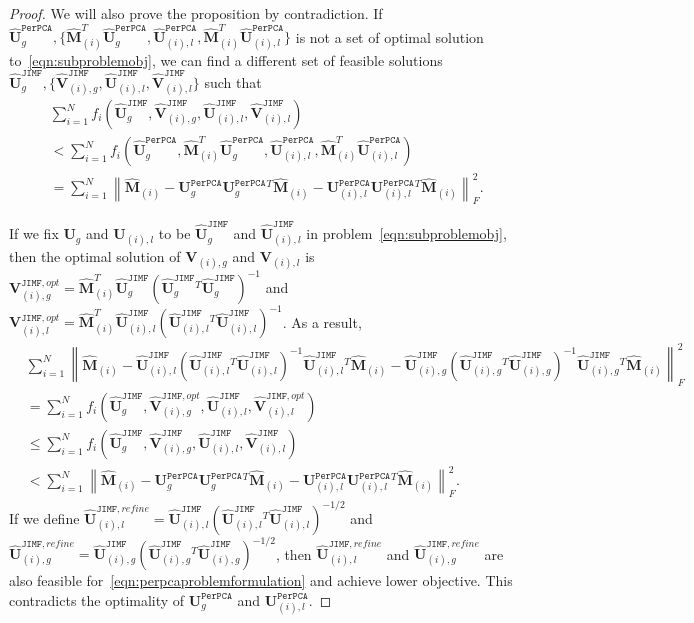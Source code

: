 \documentclass[twoside,11pt]{article}
\def\inneralg{\texttt{JIMF}\xspace}
\def\perpca{\texttt{PerPCA}\xspace}
\newcommand{\norm}[1]{\left\lVert#1\right\rVert}
\newcommand{\matU}{\mathbf{U}}
\newcommand{\matV}{\mathbf{V}}
\newcommand{\hmatM}{\hat{\mathbf{M}}}
\newcommand{\hmatU}{\hat{\mathbf{U}}}
\newcommand{\hmatV}{\hat{\mathbf{V}}}
\begin{document}
\begin{proof}
We will also prove the proposition by contradiction. If $\hmatU_g^{\perpca},\{\hmatM_{(i)}^T\hmatU_g^{\perpca},\hmatU^{\perpca}_{(i),l}, \hmatM_{(i)}^T\hmatU_{(i),l}^{\perpca}\}$ is not a set of optimal solution to~\eqref{eqn:subproblemobj}, we can find a different set of feasible solutions $\hmatU_g^{\inneralg},\{\hmatV^{\inneralg}_{(i),g},\hmatU^{\inneralg}_{(i),l},\hmatV^{\inneralg}_{(i),l}\}$ such that
$$
\begin{aligned}
&\sum_{i=1}^N f_i\left(\hmatU^{\inneralg}_g,\hmatV^{\inneralg}_{(i),g},\hmatU^{\inneralg}_{(i),l},\hmatV^{\inneralg}_{(i),l}\right)\\
&< \sum_{i=1}^Nf_i\left(\hmatU_g^{\perpca},\hmatM_{(i)}^T\hmatU_g^{\perpca},\hmatU^{\perpca}_{(i),l}, \hmatM_{(i)}^T\hmatU_{(i),l}^{\perpca}\right) \\
& = \sum_{i=1}^N\norm{\hmatM_{(i)}-\matU^{\perpca}_g\matU^{\perpca}_g{}^T\hmatM_{(i)}-\matU^{\perpca}_{(i),l}\matU^{\perpca}_{(i),l}{}^T\hmatM_{(i)}}_F^2.
\end{aligned}
$$

If we fix $\matU_g$ and $\matU_{(i),l}$ to be $\hmatU^{\inneralg}_g$ and $\hmatU^{\inneralg}_{(i),l}$ in problem~\eqref{eqn:subproblemobj}, then the optimal solution of $\matV_{(i),g}$ and $\matV_{(i),l}$ is $\matV^{\inneralg,opt}_{(i),g} = \hmatM_{(i)}^T\hmatU^{\inneralg}_g\left(\hmatU^{\inneralg}_g{}^T\hmatU^{\inneralg}_g\right)^{-1}$ and $\matV^{\inneralg,opt}_{(i),l} = \hmatM_{(i)}^T\hmatU^{\inneralg}_{(i),l}\left(\hmatU^{\inneralg}_{(i),l}{}^T\hmatU^{\inneralg}_{(i),l}\right)^{-1}$. As a result,
$$
\begin{aligned}
&\sum_{i=1}^N\norm{\hmatM_{(i)}-\hmatU^{\inneralg}_{(i),l}\left(\hmatU^{\inneralg}_{(i),l}{}^T\hmatU^{\inneralg}_{(i),l}\right)^{-1}\hmatU^{\inneralg}_{(i),l}{}^T\hmatM_{(i)}-\hmatU^{\inneralg}_{(i),g}\left(\hmatU^{\inneralg}_{(i),g}{}^T\hmatU^{\inneralg}_{(i),g}\right)^{-1}\hmatU^{\inneralg}_{(i),g}{}^T\hmatM_{(i)}}_F^2\\
&=\sum_{i=1}^N f_i\left(\hmatU^{\inneralg}_g,\hmatV^{\inneralg,opt}_{(i),g},\hmatU^{\inneralg}_{(i),l},\hmatV^{\inneralg,opt}_{(i),l}\right)\\
&\le \sum_{i=1}^N f_i\left(\hmatU^{\inneralg}_g,\hmatV^{\inneralg}_{(i),g},\hmatU^{\inneralg}_{(i),l},\hmatV^{\inneralg}_{(i),l}\right)\\
&< \sum_{i=1}^N\norm{\hmatM_{(i)}-\matU^{\perpca}_g\matU^{\perpca}_g{}^T\hmatM_{(i)}-\matU^{\perpca}_{(i),l}\matU^{\perpca}_{(i),l}{}^T\hmatM_{(i)}}_F^2.
\end{aligned}
$$
If we define $\hmatU^{\inneralg,refine}_{(i),l}=\hmatU^{\inneralg}_{(i),l}\left(\hmatU^{\inneralg}_{(i),l}{}^T\hmatU^{\inneralg}_{(i),l}\right)^{-1/2}$ and $\hmatU^{\inneralg,refine}_{(i),g}=\hmatU^{\inneralg}_{(i),g}\left(\hmatU^{\inneralg}_{(i),g}{}^T\hmatU^{\inneralg}_{(i),g}\right)^{-1/2}$, then $\hmatU^{\inneralg,refine}_{(i),l}$ and $\hmatU^{\inneralg,refine}_{(i),g}$ are also feasible for~\eqref{eqn:perpcaproblemformulation} and achieve lower objective. This contradicts the optimality of $\matU_g^{\perpca}$ and $\matU_{(i),l}^{\perpca}$.

\end{proof}
\end{document}
